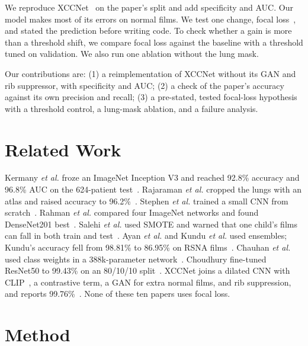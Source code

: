 \documentclass[conference]{IEEEtran}
\begin{document}
We reproduce XCCNet~\cite{raghaw2024} on the paper's split and add specificity and AUC. Our model makes most of its errors on normal films. We test one change, focal loss~\cite{lin2017}, and stated the prediction before writing code. To check whether a gain is more than a threshold shift, we compare focal loss against the baseline with a threshold tuned on validation. We also run one ablation without the lung mask.

Our contributions are: (1) a reimplementation of XCCNet without its GAN and rib suppressor, with specificity and AUC; (2) a check of the paper's accuracy against its own precision and recall; (3) a pre-stated, tested focal-loss hypothesis with a threshold control, a lung-mask ablation, and a failure analysis.

\section{Related Work}
Kermany \textit{et al.} froze an ImageNet Inception V3 and reached 92.8\% accuracy and 96.8\% AUC on the 624-patient test~\cite{kermany2018}. Rajaraman \textit{et al.} cropped the lungs with an atlas and raised accuracy to 96.2\%~\cite{rajaraman2018}. Stephen \textit{et al.} trained a small CNN from scratch~\cite{stephen2019}. Rahman \textit{et al.} compared four ImageNet networks and found DenseNet201 best~\cite{rahman2020}. Salehi \textit{et al.} used SMOTE and warned that one child's films can fall in both train and test~\cite{salehi2021}. Ayan \textit{et al.} and Kundu \textit{et al.} used ensembles; Kundu's accuracy fell from 98.81\% to 86.95\% on RSNA films~\cite{ayan2021,kundu2021}. Chauhan \textit{et al.} used class weights in a 388k-parameter network~\cite{chauhan2025}. Choudhury fine-tuned ResNet50 to 99.43\% on an 80/10/10 split~\cite{choudhury2026}. XCCNet joins a dilated CNN with CLIP~\cite{radford2021}, a contrastive term, a GAN for extra normal films, and rib suppression, and reports 99.76\%~\cite{raghaw2024}. None of these ten papers uses focal loss.

\section{Method}
\end{document}
